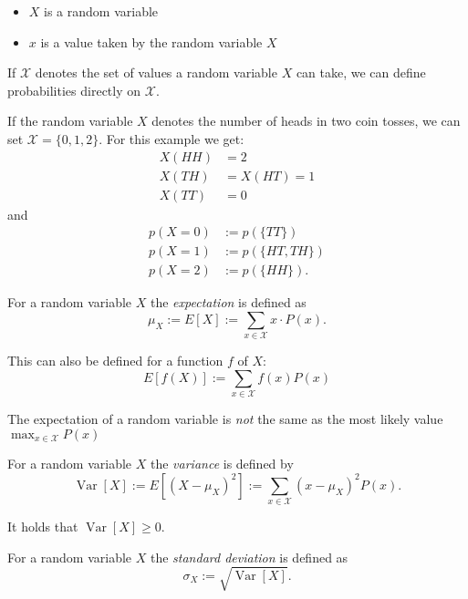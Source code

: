 \begin{notation}\hfill
\begin{itemize}
\item \(X\) is a random variable
\item \(x\) is a value taken by the random variable \(X\)
\end{itemize}
\end{notation}

If \(\mathcal{X}\) denotes the set of values a random variable \(X\) can take, we can define probabilities directly on \(\mathcal{X}\).

\begin{example}
If the random variable \(X\) denotes the number of heads in two coin tosses, we can set \(\mathcal{X} = \{0, 1, 2\}\). For this example we get:
\begin{align*}
X(HH) &= 2\\
X(TH) &= X(HT) = 1\\
X(TT) &= 0
\end{align*}
and
\begin{align*}
p(X = 0) &:= p(\{TT\})\\
p(X = 1) &:= p(\{HT, TH\})\\
p(X = 2) &:= p(\{HH\}).
\end{align*}
\end{example}

\begin{definition}[Expectation]
For a random variable \(X\) the \textit{expectation} is defined as
\[
\mu_X := E[X] := \sum_{x \in \mathcal{X}} x \cdot P(x).
\]

This can also be defined for a function \(f\) of \(X\):
\[
E[f(X)] := \sum_{x \in \mathcal{X}} f(x) P(x)
\]
\end{definition}

\begin{remark}
The expectation of a random variable is \textit{not} the same as the most likely value \(\max_{x \in \mathcal{X}} P(x)\)
\end{remark}

\begin{definition}[Variance]
For a random variable \(X\) the \textit{variance} is defined by
\[
\operatorname{Var}[X] := E[(X - \mu_X)^2] := \sum_{x \in \mathcal{X}} (x - \mu_X)^2 P(x).
\]

It holds that \(\operatorname{Var}[X] \geq 0\).
\end{definition}

\begin{definition}
For a random variable \(X\) the \textit{standard deviation} is defined as
\[
\sigma_X := \sqrt{\operatorname{Var}[X]}.
\]
\end{definition}

